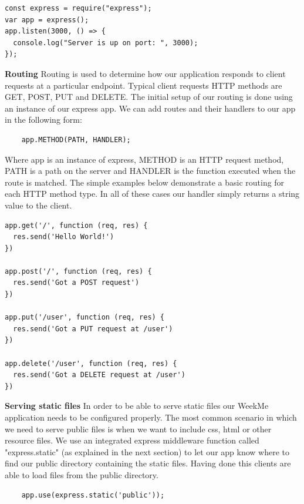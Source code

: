 \begin{lstlisting}
const express = require("express");
var app = express();
app.listen(3000, () => {
  console.log("Server is up on port: ", 3000); 
});  
\end{lstlisting}    



\textbf{Routing} 
Routing is used to determine how our application responds to client requests at a particular endpoint.  
Typical client requests HTTP methods are GET, POST, PUT and DELETE. The initial setup of our routing is done using an instance of our express app. We can add routes and their handlers to our app in the following form:

\begin{lstlisting}
	app.METHOD(PATH, HANDLER); 
\end{lstlisting}

Where app is an instance of express, METHOD is an HTTP request method, PATH is a path on the server and HANDLER is the function executed when the route is matched. The simple examples below demonstrate a basic routing for each HTTP method type. In all of these cases our handler simply returns a string value to the client.   

\begin{lstlisting}
app.get('/', function (req, res) {
  res.send('Hello World!')
})

app.post('/', function (req, res) {
  res.send('Got a POST request')
})

app.put('/user', function (req, res) {
  res.send('Got a PUT request at /user')
})

app.delete('/user', function (req, res) {
  res.send('Got a DELETE request at /user')
})

\end{lstlisting}


\textbf{Serving static files}
In order to be able to serve static files our WeekMe application needs to be configured properly. The most common scenario in which we need to serve public files is when we want to include css, html or other resource files. We use an integrated express middleware function called "express.static" (as explained in the next section) to let our app know where to find our public directory containing the static files. Having done this clients are able to load files from the public directory.     

\begin{lstlisting}
	app.use(express.static('public'));  
\end{lstlisting}



